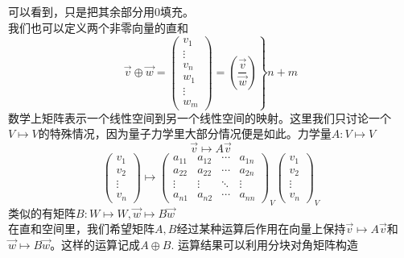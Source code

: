\documentclass[a4paper,11pt]{article}
\begin{document}
    可以看到，只是把其余部分用0填充。\\
    我们也可以定义两个非零向量的直和
    \begin{equation}
        \left.\vec{v} \oplus \vec{w}=\left(\begin{array}{c}
            v_{1} \\
            \vdots \\
            v_{n} \\
            \hline w_{1} \\
            \vdots \\
            w_{m}
            \end{array}\right)=\left(\frac{\vec{v}}{\vec{w}}\right)\right\} n+m
    \end{equation}
    数学上矩阵表示一个线性空间到另一个线性空间的映射。这里我们只讨论一个$V\mapsto V$的特殊情况，因为量子力学里大部分情况便是如此。力学量$A:V\mapsto V$
    \begin{equation}
        \vec{v}\mapsto A\vec{v}
    \end{equation}
    \begin{equation}
        \left(\begin{array}{c}
            v_{1} \\
            v_{2} \\
            \vdots \\
            v_{n}
            \end{array}\right) \longmapsto\left(\begin{array}{cccc}
            a_{11} & a_{12} & \cdots & a_{1 n} \\
            a_{22} & a_{22} & \cdots & a_{2 n} \\
            \vdots & \vdots & \ddots & \vdots \\
            a_{n 1} & a_{n 2} & \cdots & a_{n n}
            \end{array}\right)_{V}\left(\begin{array}{c}
            v_{1} \\
            v_{2} \\
            \vdots \\
            v_{n}
            \end{array}\right)_{V}
    \end{equation}
    类似的有矩阵$B:W\mapsto W,\vec{w}\mapsto B\vec{w}$\\
    在直和空间里，我们希望矩阵$A,B$经过某种运算后作用在向量上保持$\vec{v}\mapsto A\vec{v}$和$\vec{w}\mapsto B\vec{w}$。这样的运算记成$A\oplus B$. 运算结果可以利用分块对角矩阵构造
\end{document}
